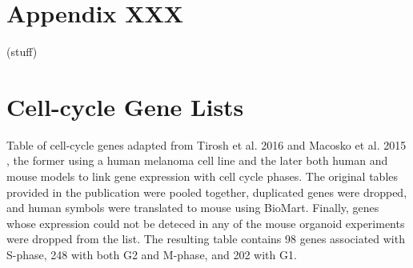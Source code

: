 {}

\appendix
\chapter{Appendix XXX}
\label{appendix:XXX}
(stuff)

\chapter{Cell-cycle Gene Lists}
\label{appendix:cycle}
Table of cell-cycle genes adapted from Tirosh et al. 2016 \cite{tirosh_dissecting_2016} and Macosko et al. 2015 \cite{macosko_highly_2015}, the former using a human melanoma cell line and the later both human and mouse models to link gene expression with cell cycle phases. The original tables provided in the publication were pooled together, duplicated genes were dropped, and human symbols were translated to mouse using BioMart. Finally, genes whose expression could not be deteced in any of the mouse organoid experiments were dropped from the list. The resulting table contains 98 genes associated with S-phase, 248 with both G2 and M-phase, and 202 with G1.

